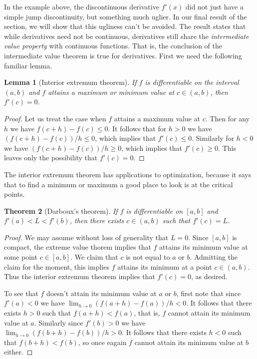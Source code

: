 \documentclass[11pt,oneside]{amsbook}
\theoremstyle{definition}
\theoremstyle{plain}
\newtheorem{theorem}{Theorem}[section]
\newtheorem{lemma}[theorem]{Lemma}
\theoremstyle{definition}
\theoremstyle{remark}
\numberwithin{equation}{section}
\numberwithin{figure}{section}
\begin{document}
In the example above, the discontinuous derivative $f'(x)$ did not just have a simple jump discontinuity, but something much uglier. In our final result of the section, we will show that this ugliness can't be avoided. The result states that while derivatives need not be continuous, derivatives still share the \emph{intermediate value property} with continuous functions. That is, the conclusion of the intermediate value theorem is true for derivatives. First we need the following familiar lemma.

\begin{lemma}[Interior extremum theorem]
  \label{thm:iet}
  If $f$ is differentiable on the interval $(a,b)$ and $f$ attains a maximum or minimum value at $c\in(a,b)$, then $f'(c)=0$.
\end{lemma}

\begin{proof}
  Let us treat the case when $f$ attains a maximum value at $c$. Then for any $h$ we have $f(c+h)-f(c)\leq0$. It follows that for $h>0$ we have $(f(c+h)-f(c))/h\leq0$, which implies that $f'(c)\leq0$. Similarly for $h<0$ we have $(f(c+h)-f(c))/h\geq0$, which implies that $f'(c)\geq0$. This leaves only the possibility that $f'(c)=0$.
\end{proof}

The interior extremum theorem has applications to optimization, because it says that to find a minimum or maximum a good place to look is at the critical points.

\begin{theorem}[Darboux's theorem]
  If $f$ is differentiable on $[a,b]$ and $f'(a)<L<f'(b)$, then there exists $c\in(a,b)$ such that $f'(c)=L$.
\end{theorem}

\begin{proof}
  We may assume without loss of generality that $L=0$. Since $[a,b]$ is compact, the extreme value thorem implies that $f$ attains its minimum value at some point $c\in[a,b]$. We claim that $c$ is not equal to $a$ or $b$. Admitting the claim for the moment, this implies $f$ attains its minimum at a point $c\in(a,b)$. Thus the interior extremum theorem implies that $f'(c)=0$, as desired.

  To see that $f$ doesn't attain its minimum value at $a$ or $b$, first note that since $f'(a)<0$ we have $\lim_{h\to0}(f(a+h)-f(a))/h<0$. It follows that there exists $h>0$ such that $f(a+h)<f(a)$, that is, $f$ cannot attain its minimum value at $a$. Similarly since $f'(b)>0$ we have $\lim_{h\to0}(f(b+h)-f(b))/h>0$. It follows that there exists $h<0$ such that $f(b+h)<f(b)$, so once eagain $f$ cannot attain its minimum value at $b$ either.
\end{proof}
\end{document}
